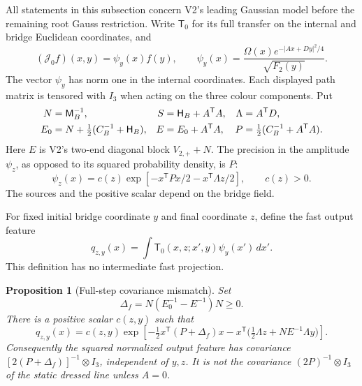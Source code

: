\documentclass[11pt,oneside]{article}
\newtheorem{proposition}[theorem]{Proposition}
\begin{document}
All statements in this subsection concern V2's leading Gaussian
model before the remaining root Gauss restriction.
Write \(\mathsf T_0\) for its full transfer on the internal and
bridge Euclidean coordinates, and
\[
 (\mathcal J_0 f)(x,y)=\psi_y(x)f(y),\qquad
 \psi_y(x)=\frac{\Omega(x)e^{-|Ax+Dy|^2/4}}{\sqrt{F_2(y)}} .
\]
The vector \(\psi_y\) has norm one in the internal coordinates.
Each displayed path matrix is tensored with \(I_3\) when acting
on the three colour components. Put
\begin{align}
 N&=\mathsf M_B^{-1},&
 S&=\mathsf H_B+A^{\mathsf T}A,&
 \Lambda&=A^{\mathsf T}D,\notag\\
 E_0&=N+\tfrac12(C_B^{-1}+\mathsf H_B),&
 E&=E_0+A^{\mathsf T}A,&
 P&=\tfrac12(C_B^{-1}+A^{\mathsf T}A).
 \label{f16v3:definitions}
\end{align}
Here \(E\) is V2's two-end diagonal block \(V_{2,+}+N\).
The precision in the amplitude \(\psi_z\), as opposed to its
squared probability density, is \(P\):
\[
 \psi_z(x)=c(z)\exp[-x^{\mathsf T}Px/2-x^{\mathsf T}\Lambda z/2],
                      \qquad c(z)>0.
\]
The sources and the positive scalar depend on the bridge field.

For fixed initial bridge coordinate \(y\) and final coordinate \(z\),
define the fast output feature
\[
 q_{z,y}(x)=\int \mathsf T_0(x,z;x',y)\psi_y(x')\,dx'.
\]
This definition has no intermediate fast projection.

\begin{proposition}[Full-step covariance mismatch]
\label{f16v3:propagation}
Set
\begin{equation}
 \Delta_f=N(E_0^{-1}-E^{-1})N\ge0.
 \label{f16v3:delta}
\end{equation}
There is a positive scalar \(c(z,y)\) such that
\begin{equation}
 q_{z,y}(x)=c(z,y)
 \exp\left[
   -\tfrac12x^{\mathsf T}(P+\Delta_f)x
   -x^{\mathsf T}\bigl(\tfrac12\Lambda z+NE^{-1}\Lambda y\bigr)
 \right].
 \label{f16v3:feature}
\end{equation}
Consequently the squared normalized output feature has covariance
\([2(P+\Delta_f)]^{-1}\otimes I_3\), independent of \(y,z\).
It is not the covariance \((2P)^{-1}\otimes I_3\) of the static
dressed line unless \(A=0\).
\end{proposition}
\end{document}
